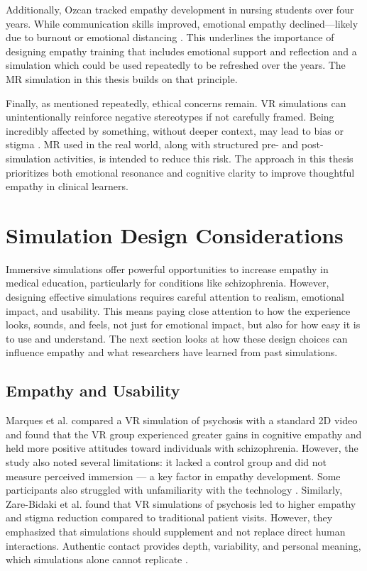 Additionally, Ozcan \cite{Ozcan2018} tracked empathy development in nursing students over four years. While communication skills improved, emotional empathy declined—likely due to burnout or emotional distancing \cite{Ozcan2018}. This underlines the importance of designing empathy training that includes emotional support and reflection and a simulation which could be used repeatedly to be refreshed over the years. The MR simulation in this thesis builds on that principle.

\vspace{1em}

Finally, as mentioned repeatedly, ethical concerns remain. VR simulations can unintentionally reinforce negative stereotypes if not carefully framed. Being incredibly affected by something, without deeper context, may lead to bias or stigma \cite{Rueda2020}. MR used in the real world, along with structured pre- and post-simulation activities, is intended to reduce this risk. The approach in this thesis prioritizes both emotional resonance and cognitive clarity to improve thoughtful empathy in clinical learners.


\section{Simulation Design Considerations}

Immersive simulations offer powerful opportunities to increase empathy in medical education, particularly for conditions like schizophrenia. However, designing effective simulations requires careful attention to realism, emotional impact, and usability. This means paying close attention to how the experience looks, sounds, and feels, not just for emotional impact, but also for how easy it is to use and understand. The next section looks at how these design choices can influence empathy and what researchers have learned from past simulations.

\subsection{Empathy and Usability}

Marques et al. compared a VR simulation of psychosis with a standard 2D video and found that the VR group experienced greater gains in cognitive empathy and held more positive attitudes toward individuals with schizophrenia. However, the study also noted several limitations: it lacked a control group and did not measure perceived immersion — a key factor in empathy development. Some participants also struggled with unfamiliarity with the technology \cite{Marques2022}. Similarly, Zare-Bidaki et al. found that VR simulations of psychosis led to higher empathy and stigma reduction compared to traditional patient visits. However, they emphasized that simulations should supplement and not replace direct human interactions. Authentic contact provides depth, variability, and personal meaning, which simulations alone cannot replicate \cite{Zare-Bidaki2022, Hsia2022}.

